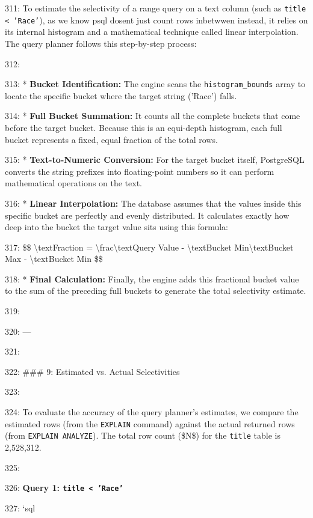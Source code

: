 \documentclass[11pt,a4paper]{article}
\begin{document}
{311: To estimate the selectivity of a range query on a text column (such as \texttt{title < 'Race'}), as we know psql dosent just count rows inbetwwen instead, it relies on its internal histogram and a mathematical technique called linear interpolation. The query planner follows this step-by-step process:

312:

313: *   \textbf{Bucket Identification:} The engine scans the \texttt{histogram\_bounds} array to locate the specific bucket where the target string ('Race') falls.

314: *   \textbf{Full Bucket Summation:} It counts all the complete buckets that come before the target bucket. Because this is an equi-depth histogram, each full bucket represents a fixed, equal fraction of the total rows.

315: *   \textbf{Text-to-Numeric Conversion:} For the target bucket itself, PostgreSQL converts the string prefixes into floating-point numbers so it can perform mathematical operations on the text.

316: *   \textbf{Linear Interpolation:} The database assumes that the values inside this specific bucket are perfectly and evenly distributed. It calculates exactly how deep into the bucket the target value sits using this formula:

317:     \$\$ \textbackslash{}text{Fraction} = \textbackslash{}frac{\textbackslash{}text{Query Value} - \textbackslash{}text{Bucket Min}}{\textbackslash{}text{Bucket Max} - \textbackslash{}text{Bucket Min}} \$\$

318: *   \textbf{Final Calculation:} Finally, the engine adds this fractional bucket value to the sum of the preceding full buckets to generate the total selectivity estimate.

319:

320: ---

321:

322: \#\#\# 9: Estimated vs. Actual Selectivities

323:

324: To evaluate the accuracy of the query planner's estimates, we compare the estimated rows (from the \texttt{EXPLAIN} command) against the actual returned rows (from \texttt{EXPLAIN ANALYZE}). The total row count (\$N\$) for the \texttt{title} table is 2,528,312.

325:

326: \textbf{Query 1: \texttt{title < 'Race'}}

327: \texttt{}`sql

}
\end{document}
